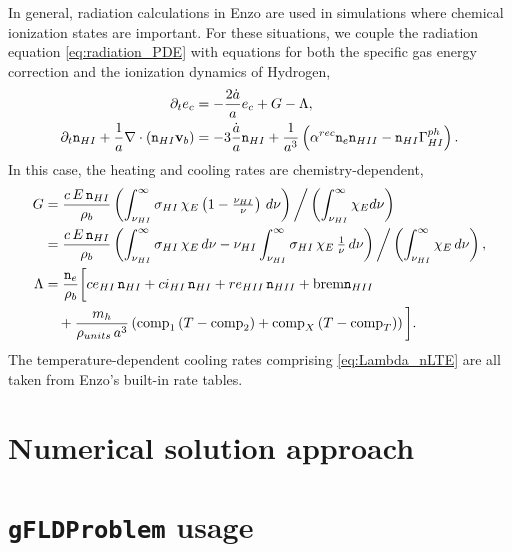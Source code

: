 \documentclass[letterpaper,10pt]{article}
\renewcommand{\(}{\left(}
\renewcommand{\)}{\right)}
\newcommand{\vb}{{\bf v}_b}
\newcommand{\rhob}{\rho_b}
\newcommand{\mn}{{\tt n}}
\begin{document}
In general, radiation calculations in Enzo are used in simulations
where chemical ionization states are important.  For these situations,
we couple the radiation equation \eqref{eq:radiation_PDE} with
equations for both the specific gas energy correction and the
ionization dynamics of Hydrogen,
\begin{align}
  \notag
  \partial_t e_c &= - \frac{2\dot{a}}{a}e_c + G - \Lambda, \\
  \label{eq:hydrogen_ionization}
  \partial_t \mn_{HI} + \frac{1}{a}\nabla\cdot\(\mn_{HI}\vb\) &=
    -3\frac{\dot{a}}{a}\mn_{HI} + \frac{1}{a^3}\left(
    \alpha^{rec} \mn_e \mn_{HII} - \mn_{HI}
    \Gamma_{HI}^{ph}\right). 
\end{align}
In this case, the heating and cooling rates are chemistry-dependent,
\begin{align}
  \label{eq:G_nLTE}
  G &= \frac{c\,E\,\mn_{HI}}{\rhob} 
    \left(\int_{\nu_{HI}}^{\infty} \sigma_{HI}\, \chi_E
    \left(1-\tfrac{\nu_{HI}}{\nu}\right)\, d\nu\right) \bigg/
    \left(\int_{\nu_{HI}}^{\infty} \chi_E d\nu\right) \\ \notag
  &= \frac{c\,E\,\mn_{HI}}{\rhob}  \left(
    \int_{\nu_{HI}}^{\infty}\sigma_{HI}\, \chi_E\, d\nu 
    -\nu_{HI} \int_{\nu_{HI}}^{\infty} \sigma_{HI}\, \chi_E\,
    \tfrac{1}{\nu}\, d\nu\right) \bigg/ \left(\int_{\nu_{HI}}^{\infty} \chi_E\,
    d\nu\right), \\
\label{eq:Lambda_nLTE}
  \Lambda &= \frac{\mn_e}{\rhob}\bigg[ce_{HI}\, \mn_{HI} 
  + ci_{HI}\, \mn_{HI} + re_{HII}\, \mn_{HII} + \text{brem}
  \mn_{HII} \\
  \notag &\quad+ \frac{m_h}{\rho_{units}\, a^3} \left(\text{comp}_1\, (T-\text{comp}_2) 
    + \text{comp}_{X}\, (T-\text{comp}_{T})\right) \bigg].
\end{align}
The temperature-dependent cooling rates comprising
\eqref{eq:Lambda_nLTE} are all taken from Enzo's built-in rate tables.





\section{Numerical solution approach}
\label{sec:solution_approach}





\section{{\tt gFLDProblem} usage}
\label{sec:module_usage}
\end{document}
